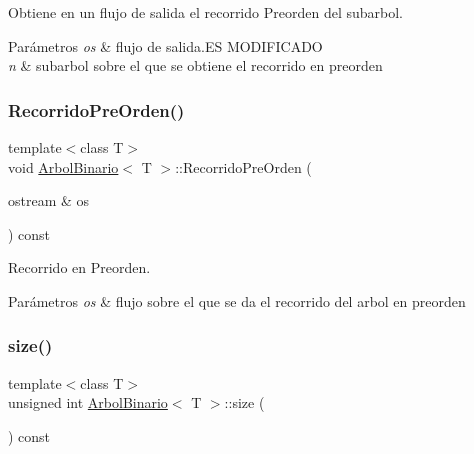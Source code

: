 Obtiene en un flujo de salida el recorrido Preorden del subarbol. 


\begin{DoxyParams}{Parámetros}
{\em os} & flujo de salida.\+ES M\+O\+D\+I\+F\+I\+C\+A\+DO \\
\hline
{\em n} & subarbol sobre el que se obtiene el recorrido en preorden \\
\hline
\end{DoxyParams}
\mbox{\label{classArbolBinario_af8cd1ed84675bcb2075ba1a502d8ee39}} 
\subsubsection{\texorpdfstring{Recorrido\+Pre\+Orden()}{RecorridoPreOrden()}}
{\footnotesize\ttfamily template$<$class T$>$ \\
void \hyperlink{classArbolBinario}{Arbol\+Binario}$<$ T $>$\+::Recorrido\+Pre\+Orden (\begin{DoxyParamCaption}\item[{ostream \&}]{os }\end{DoxyParamCaption}) const}



Recorrido en Preorden. 


\begin{DoxyParams}{Parámetros}
{\em os} & flujo sobre el que se da el recorrido del arbol en preorden \\
\hline
\end{DoxyParams}
\mbox{\label{classArbolBinario_a3df34c7cbcbaa42b68884e5fcde93334}} 
\subsubsection{\texorpdfstring{size()}{size()}}
{\footnotesize\ttfamily template$<$class T$>$ \\
unsigned int \hyperlink{classArbolBinario}{Arbol\+Binario}$<$ T $>$\+::size (\begin{DoxyParamCaption}{ }\end{DoxyParamCaption}) const}



